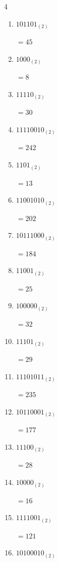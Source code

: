 \begin{multicols}{4}
\begin{enumerate}
        $=96$

  \item $101101_{(2)}$

        $=45$

  \item $1000_{(2)}$

        $=8$

  \item $11110_{(2)}$

        $=30$

  \item $11110010_{(2)}$

        $=242$

  \item $1101_{(2)}$

        $=13$

  \item $11001010_{(2)}$

        $=202$

  \item $10111000_{(2)}$

        $=184$

  \item $11001_{(2)}$

        $=25$

  \item $100000_{(2)}$

        $=32$

  \item $11101_{(2)}$

        $=29$

  \item $11101011_{(2)}$

        $=235$

  \item $10110001_{(2)}$

        $=177$

\columnbreak %

  \item $11100_{(2)}$

        $=28$

  \item $10000_{(2)}$

        $=16$

  \item $1111001_{(2)}$

        $=121$

  \item $10100010_{(2)}$


\end{enumerate}
\end{multicols}
